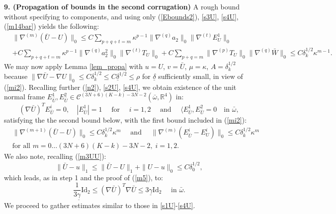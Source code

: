 \documentclass[reqno,twoside,11pt]{amsart}
\newcommand{\Id}{\mathrm{Id}}
\newcommand{\R}{\mathbb{R}}
\numberwithin{equation}{section}
\theoremstyle{plain}
\theoremstyle{definition}
\begin{document}
\smallskip

{\bf 9. (Propagation of bounds in the second corrugation)} A rough
bound without specifying to components, and using only
(\ref{Ebounds2}), \ref{s3U}, \ref{s4U}, (\ref{m14bar}) yields the following: 
\begin{equation}\label{mi2}
\begin{split} 
& \|\nabla^{(m)} (\bar U-U)\|_0\leq C\sum_{p+q+t=m}\kappa^{p-1}
\|\nabla^{(q)}a_2\|_0\|\nabla^{(t)}E^1_{U}\|_0  \\ & +  C\sum_{p+q+t=m}\kappa^{p-1}
\|\nabla^{(q)}a_2^2\|_0\|\nabla^{(t)}T_{U}\|_0 + C\sum_{p+q=m}
\|\nabla^{(p)}T_{U}\|_0 \|\nabla^{(q)}\bar W\|_0 \leq C \delta_k^{1/2}\kappa^{m-1}.
\end{split}
\end{equation}
We may now apply Lemma \ref{lem_propa} with $u=U$, $v=\bar U$, $\mu=\kappa$,
$A=\delta_k^{1/2}$ because $\|\nabla
\bar U-\nabla U\|_0\leq C\delta_k^{1/2}\leq C{\underline\delta}^{1/2}\leq
\rho$ for $\underline\delta$ sufficiently small, in view of (\ref{mi2}). Recalling
further (\ref{n2}), \ref{s2U}, \ref{s4U}, we obtain existence of the
unit normal frame $E^1_{\bar U},
E^2_{\bar U}\in\mathcal{C}^{(3N+6)(K-k)-3N-2}(\bar\omega, \R^4)$ in:
$$(\nabla \bar U)^TE^i_{\bar U}=0,\quad |E^1_{\bar U}|=1\quad\mbox{ for }\quad 
i=1,2\quad\mbox{ and } \quad \langle E^1_{\bar U}, E^2_{\bar U}=0\quad\mbox{in } \bar\omega,$$
satisfying the the second bound below, with the first bound included in (\ref{mi2}):
\begin{equation}\label{n1dbar}
\begin{split}
& \|\nabla^{(m+1)}(\bar U-U)\|_0\leq C\delta_k^{1/2}\kappa^{m}
\quad \mbox{ and }\quad \|\nabla^{(m)}(E^i_{\bar U}-E^i_{U})\|_0\leq C\delta_k^{1/2}\kappa^{m}
\\ & \mbox{for all } m=0\ldots (3N+6)(K-k)-3N-2,\; i=1,2.
\end{split}
\end{equation}
We also note, recalling (\ref{m3UU}):
\begin{equation}\label{m3UUd}
\|\bar U-u\|_1\leq \|\bar U-U \|_1 + \|U-u\|_0 \leq C\delta_0^{1/2},
\end{equation}
which leads, as in step 1 and the proof of (\ref{m5}), to:
\begin{equation}\label{n2d}
\frac{1}{3\underline\gamma}\Id_2\leq (\nabla \bar U)^T\nabla \bar U\leq
3\underline\gamma\Id_2 \quad\mbox{ in } \bar\omega.
\end{equation}
We proceed to gather estimates similar to those in \ref{s1U}-\ref{s4U}. 
\end{document}
